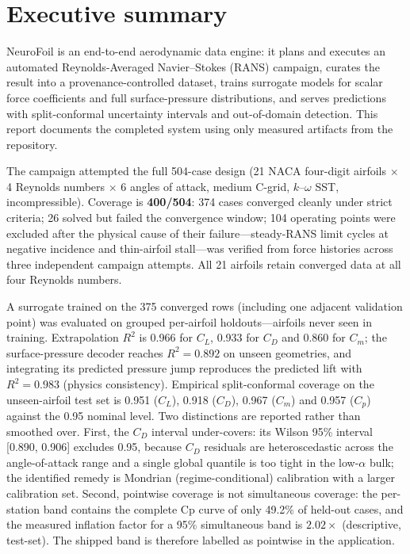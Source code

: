 \documentclass[11pt,a4paper]{article}
\begin{document}
\tableofcontents
\newpage

\section{Executive summary}

NeuroFoil is an end-to-end aerodynamic data engine: it plans and executes an
automated Reynolds-Averaged Navier--Stokes (RANS) campaign, curates the result
into a provenance-controlled dataset, trains surrogate models for scalar force
coefficients and full surface-pressure distributions, and serves predictions
with split-conformal uncertainty intervals and out-of-domain detection. This
report documents the completed system using only measured artifacts from the
repository.

The campaign attempted the full 504-case design (21 NACA four-digit airfoils
$\times$ 4 Reynolds numbers $\times$ 6 angles of attack, medium C-grid,
$k$--$\omega$ SST, incompressible). Coverage is \textbf{400/504}: 374 cases
converged cleanly under strict criteria; 26 solved but failed the convergence
window; 104 operating points were excluded after the physical cause of their
failure---steady-RANS limit cycles at negative incidence and thin-airfoil
stall---was verified from force histories across three independent campaign
attempts. All 21 airfoils retain converged data at all four Reynolds numbers.

A surrogate trained on the 375 converged rows (including one adjacent
validation point) was evaluated on grouped per-airfoil holdouts---airfoils
never seen in training. Extrapolation $R^2$ is 0.966 for $C_L$, 0.933 for
$C_D$ and 0.860 for $C_m$; the surface-pressure decoder reaches $R^2 = 0.892$
on unseen geometries, and integrating its predicted pressure jump reproduces
the predicted lift with $R^2 = 0.983$ (physics consistency). Empirical
split-conformal coverage on the unseen-airfoil test set is 0.951 ($C_L$),
0.918 ($C_D$), 0.967 ($C_m$) and 0.957 ($C_p$) against the 0.95 nominal level.
Two distinctions are reported rather than smoothed over. First, the $C_D$
interval under-covers: its Wilson 95\% interval [0.890, 0.906] excludes 0.95,
because $C_D$ residuals are heteroscedastic across the angle-of-attack range
and a single global quantile is too tight in the low-$\alpha$ bulk; the
identified remedy is Mondrian (regime-conditional) calibration with a larger
calibration set. Second, pointwise coverage is not simultaneous coverage: the
per-station band contains the complete Cp curve of only 49.2\% of held-out
cases, and the measured inflation factor for a 95\% simultaneous band is
$2.02\times$ (descriptive, test-set). The shipped band is therefore labelled
as pointwise in the application.
\end{document}
